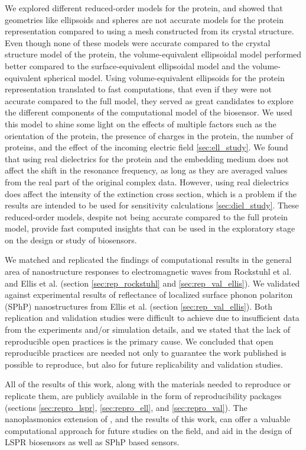 We explored different reduced-order models for the protein, and showed that geometries like ellipsoids and spheres
are not accurate models for the protein representation compared to using a mesh constructed from its crystal structure. Even though
none of these models were accurate compared to the crystal structure model of the protein, the volume-equivalent ellipsoidal model performed better 
compared to the surface-equivalent ellipsoidal model and the volume-equivalent spherical model. Using volume-equivalent ellipsoids for the protein representation 
translated to fast computations, that even if they were not accurate compared to the full model, they served as great candidates to
explore the different components of the computational model of the biosensor. We used this model to shine some light on the effects of multiple factors such as 
the orientation of the protein, the presence of charges in the protein, the number of proteins, and the effect of the incoming electric field \ref{sec:ell_study}.
We found that using real dielectrics for the protein and the embedding medium does not affect the shift in the resonance frequency, 
as long as they are averaged values from the real part of the original complex data. However, using real dielectrics does affect the 
intensity of the extinction cross section, which is a problem if the results are intended to be used for sensitivity calculations \ref{sec:diel_study}. 
These reduced-order models, despite not being accurate compared to the full protein model, provide fast computed insights that can be used 
in the exploratory stage on the design or study of biosensors.

We matched and replicated the findings of computational results in the general area of nanostructure responses to electromagnetic waves 
from Rockstuhl et al. \cite{rockstuhl2005} and Ellis et al.\cite{ellis2016} (section \ref{sec:rep_rockstuhl} and \ref{sec:rep_val_ellis}). We validated
\pygbe against experimental results of reflectance of localized surface phonon polariton (SPhP) nanostructures from Ellis et 
al. (section \ref{sec:rep_val_ellis}). Both replication and validation studies were difficult to achieve due to insufficient data from the experiments 
and/or simulation details, and we stated that the lack of reproducible open practices is the primary cause. We concluded that open reproducible 
practices are needed not only to guarantee the work published is possible to reproduce, but also for future replicability and validation studies. 

All of the results of this work, along with the materials needed to reproduce or replicate them, are publicly available in the form of 
reproducibility packages (sections \ref{sec:repro_lspr}, \ref{sec:repro_ell}, and \ref{sec:repro_val}). The nanoplasmonics extension of \pygbe, and 
the results of this work, can offer a valuable computational approach for future studies on the field, and aid in the design of LSPR biosensors 
as well as SPhP based sensors. 



